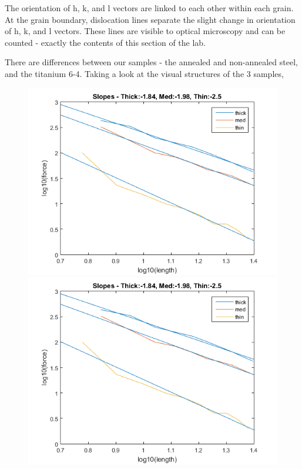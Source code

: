 \documentclass{article}
\begin{document}
The orientation of h, k, and l vectors are linked to each other within each grain. At the grain boundary, dislocation lines separate the slight change in orientation of h, k, and l vectors. These lines are visible to optical microscopy and can be counted - exactly the contents of this section of the lab.

There are differences between our samples - the annealed and non-annealed steel, and the titanium 6-4. Taking a look at the visual structures of the 3 samples,

\begin{figure}[h]
	\begin{minipage}{0.32\textwidth}
		\centering
		\includegraphics[scale=.3]{Lab1f1.png}
	\end{minipage}
	\begin{minipage}{0.32\textwidth}
		\centering
		\includegraphics[scale=.3]{Lab1f1.png}

\end{minipage}
\end{figure}
\end{document}
